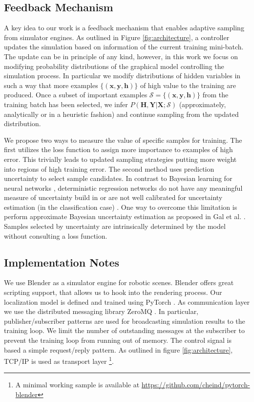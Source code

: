 \documentclass[conference]{IEEEtran}
\begin{document}
\subsection{Feedback Mechanism}
    \label{sec:feedback}
    A key idea to our work is a feedback mechanism that enables adaptive sampling from simulator engines. As outlined in Figure \ref{fig:architecture}, a controller updates the simulation based on information of the current training mini-batch. The update can be in principle of any kind, however, in this work we focus on modifying probability distributions of the graphical model controlling the simulation process. In particular we modify distributions of hidden variables in such a way that more examples $\{(\textbf{x},\textbf{y},\textbf{h})\}$ of high value to the training are produced. Once a subset of important examples $\mathcal{S} = \{(\textbf{x},\textbf{y},\textbf{h})\}$ from the training batch has been selected, we infer $P(\textbf{H},\textbf{Y} \lvert \textbf{X};\mathcal{S})$ (approximately, analytically or in a heuristic fashion) and continue sampling from the updated distribution.

    We propose two ways to measure the value of specific samples for training. The first utilizes the loss function to assign more importance to examples of high error. This trivially leads to updated sampling strategies putting more weight into regions of high training error. The second method uses prediction uncertainty to select sample candidates. In contrast to Bayesian learning for neural networks \cite{neal2012bayesian}, deterministic regression networks do not have any meaningful measure of uncertainty build in or are not well calibrated for uncertainty estimation (in the classification case) \cite{guo2017calibration}. One way to overcome this limitation is perform approximate Bayesian uncertainty estimation as proposed in Gal et al. \cite{gal2015dropout}. Samples selected by uncertainty are intrinsically determined by the model without consulting a loss function.
    

\subsection{Implementation Notes}
    We use Blender \cite{blender} as a simulator engine for robotic scenes. Blender offers great scripting support, that allows us to hook into the rendering process. Our localization model is defined and trained using PyTorch \cite{paszke2017automatic}. As communication layer we use the distributed messaging library ZeroMQ \cite{zeromq_guide}. In particular, publisher/subscriber patterns are used for broadcasting simulation results to the training loop. We limit the number of outstanding messages at the subscriber to prevent the training loop from running out of memory. The control signal is based a simple request/reply pattern. As outlined in figure \ref{fig:architecture}, TCP/IP is used as transport layer \footnote{A minimal working sample is available at \url{https://github.com/cheind/pytorch-blender}}.
\end{document}
